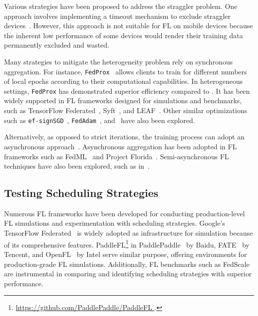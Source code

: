 \documentclass[conference]{IEEEtran}
\begin{document}
Various strategies have been proposed to address the straggler problem.
One approach involves implementing a timeout mechanism to exclude
straggler devices~\cite{bonawitz2019towards}.
However, this approach is not suitable for FL on mobile devices because
the inherent low performance of some devices would render
their training data permanently excluded and wasted.

\newcommand{\FedProx}{\texttt{FedProx}}
\newcommand{\TFF}{TensorFlow Federated~\cite{tff}}

Many strategies to mitigate the heterogeneity problem rely on
synchronous aggregation.
For instance,
\FedProx{}~\cite{li2020federated}
allows clients to train for different numbers of local epochs according to
their computational capabilities.
In heterogeneous settings,
\FedProx{} has demonstrated superior efficiency compared to \FedAvg{} .
It has been widely supported in FL frameworks designed for simulations and
benchmarks, such as
\TFF{},
Syft~\cite{ryffel2018generic,Ziller2021,hall2021syft}, and
LEAF~\cite{caldas2018leaf}.
Other similar optimizations such as
\verb|ef-signSGD|~\cite{karimireddy2019error},
\verb|FedAdam|~\cite{reddi2020adaptive},
and~\cite{luo2021cost} have also been explored.

\newcommand{\FedML}{FedML~\cite{he2020fedml}}
\newcommand{\Florida}{Project Florida~\cite{madrigal2023project}}

Alternatively,
as opposed to strict iterations,
the training process can adopt an
asynchronous approach~\cite{chilimbi2014project,zhu2022online,huba2022papaya}.
Asynchronous aggregation has been adopted in
FL frameworks such as \FedML{} and \Florida{}.
Semi-asynchronous FL techniques have also been explored,
such as in~\cite{sun2022fedsea}.

\subsection{Testing Scheduling Strategies}

Numerous FL frameworks have been developed for
conducting production-level FL simulations and
experimentation with scheduling strategies.
Google's \TFF{} is widely adopted as infrastructure for simulation because of
its comprehensive features.
PaddleFL\footnote{\url{
    https://github.com/PaddlePaddle/PaddleFL
}.} in PaddlePaddle~\cite{ma2019paddlepaddle} by Baidu,
FATE~\cite{liu2021fate} by Tencent, and
OpenFL~\cite{patrick2022openfl} by Intel
serve similar purpose,
offering environments for production-grade FL simulations.
Additionally,
FL benchmarks such as FedScale~\cite{lai2022fedscale} are instrumental in
comparing and identifying scheduling strategies with superior performance.
\end{document}
